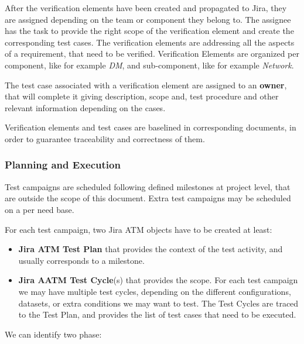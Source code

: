 After the verification elements have been created and propagated to Jira, they are assigned depending on the team or
component they belong to.
The assignee has the task to provide the right scope of the verification element and create the corresponding test cases.
The verification elements are addressing all the aspects of a  requirement, that need to be verified.
Verification Elements are organized per component, like for example \textit{DM}, and sub-component, like for example \textit{Network}. 

The test case associated with a verification element are assigned to an \textbf{owner},  that will complete it giving description,
 scope and, test procedure and other relevant information depending on the cases.

Verification elements and test cases are baselined in corresponding documents, in order to guarantee traceability and correctness of them.


\subsubsection{Planning and Execution}

Test campaigns are scheduled following defined milestones at project level, that are outside the scope of this document.
Extra test campaigns may be scheduled on a per need base.

For each test campaign, two Jira ATM objects have to be created at least:

\begin{itemize}
\item \textbf{Jira ATM Test Plan} that provides the context of the test activity, and usually corresponds to a milestone.
\item \textbf{Jira AATM Test Cycle}(s) that provides the scope. For each test campaign we may have multiple test cycles, 
depending on the different configurations, datasets, or extra conditions we may want to test. The Test Cycles are traced
to the Test Plan, and provides the list of test cases that need to be executed.
\end{itemize}

We can identify two phase:

